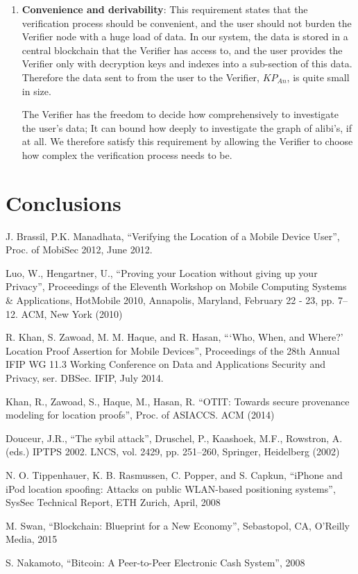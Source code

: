 \documentclass[12pt]{article}
\begin{document}
\begin{enumerate}
\item[] \textbf{Convenience and derivability}: This requirement states that the verification process should be convenient, and the user should not burden the Verifier node with a huge load of data. In our system, the data is stored in a central blockchain that the Verifier has access to, and the user provides the Verifier only with decryption keys and indexes into a sub-section of this data. Therefore the data sent to from the user to the Verifier, $KP_{An}$, is quite small in size.

The Verifier has the freedom to decide how comprehensively to investigate the user's data; It can bound how deeply to investigate the graph of alibi's, if at all. We therefore satisfy this requirement by allowing the Verifier to choose how complex the verification process needs to be.
\end{enumerate}

\section{Conclusions}

\begin{thebibliography}{9}

  J. Brassil, P.K. Manadhata,
  ``Verifying the Location of a Mobile Device User'',
  Proc. of MobiSec 2012,
  June 2012.

  Luo, W., Hengartner, U.,
  ``Proving your Location without giving up your Privacy'',
  Proceedings of the Eleventh Workshop on Mobile Computing Systems \& Applications,
  HotMobile 2010, Annapolis, Maryland, February 22 - 23, pp. 7–12. ACM,
  New York (2010)

  R. Khan, S. Zawoad, M. M. Haque, and R. Hasan,
  ```Who, When, and Where?' Location Proof Assertion for Mobile Devices'',
  Proceedings of the 28th Annual IFIP WG 11.3 Working Conference on Data and Applications Security and Privacy, ser. DBSec. IFIP,
  July 2014.
 
  Khan, R., Zawoad, S., Haque, M., Hasan, R.
  ``OTIT: Towards secure provenance modeling for location proofs'',
  Proc. of ASIACCS. ACM (2014)

  Douceur, J.R.,
  ``The sybil attack'',
  Druschel, P., Kaashoek, M.F., Rowstron, A. (eds.) IPTPS 2002. LNCS, vol. 2429, pp. 251–260,
  Springer, Heidelberg (2002)

  N. O. Tippenhauer, K. B. Rasmussen, C. Popper, and S. Capkun,
  ``iPhone and iPod location spoofing: Attacks on public WLAN-based positioning systems'',
  SysSec Technical Report,
  ETH Zurich, April, 2008

  M. Swan,
  ``Blockchain: Blueprint for a New Economy'',
  Sebastopol, CA,
  O’Reilly Media, 2015

  S. Nakamoto,
  ``Bitcoin: A Peer-to-Peer Electronic Cash System'',
  2008

\end{thebibliography}
\end{document}
